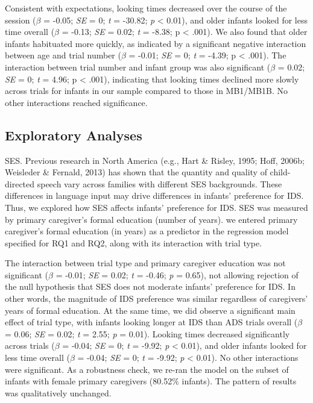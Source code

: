 \documentclass[
  ,man,floatsintext]{apa6}
\begin{document}
Consistent with expectations, looking times decreased over the course of the session (\emph{\(\beta\)} = -0.05; \emph{SE} = 0; \emph{t} = -30.82; \emph{p} \textless{} 0.01), and older infants looked for less time overall (\emph{\(\beta\)} = -0.13; \emph{SE} = 0.02; \emph{t} = -8.38; p \textless{} .001). We also found that older infants habituated more quickly, as indicated by a significant negative interaction between age and trial number (\emph{\(\beta\)} = -0.01; \emph{SE} = 0; \emph{t} = -4.39; p \textless{} .001). The interaction between trial number and infant group was also significant (\emph{\(\beta\)} = 0.02; \emph{SE} = 0; \emph{t} = 4.96; p \textless{} .001), indicating that looking times declined more slowly across trials for infants in our sample compared to those in MB1/MB1B. No other interactions reached significance.

\hypertarget{exploratory-analyses}{%
\subsection{Exploratory Analyses}\label{exploratory-analyses}}

SES. Previous research in North America (e.g., Hart \& Risley, 1995; Hoff, 2006b; Weisleder \& Fernald, 2013) has shown that the quantity and quality of child-directed speech vary across families with different SES backgrounds. These differences in language input may drive differences in infants' preference for IDS. Thus, we explored how SES affects infants' preference for IDS. SES was measured by primary caregiver's formal education (number of years). we entered primary caregiver's formal education (in years) as a predictor in the regression model specified for RQ1 and RQ2, along with its interaction with trial type.

The interaction between trial type and primary caregiver education was not significant (\emph{\(\beta\)} = -0.01; \emph{SE} = 0.02; \emph{t} = -0.46; \emph{p} = 0.65), not allowing rejection of the null hypothesis that SES does not moderate infants' preference for IDS. In other words, the magnitude of IDS preference was similar regardless of caregivers' years of formal education. At the same time, we did observe a significant main effect of trial type, with infants looking longer at IDS than ADS trials overall (\emph{\(\beta\)} = 0.06; \emph{SE} = 0.02; \emph{t} = 2.55; \emph{p} = 0.01). Looking times decreased significantly across trials (\emph{\(\beta\)} = -0.04; \emph{SE} = 0; \emph{t} = -9.92; \emph{p} \textless{} 0.01), and older infants looked for less time overall (\emph{\(\beta\)} = -0.04; \emph{SE} = 0; \emph{t} = -9.92; \emph{p} \textless{} 0.01). No other interactions were significant. As a robustness check, we re-ran the model on the subset of infants with female primary caregivers (80.52\% infants). The pattern of results was qualitatively unchanged.
\end{document}

